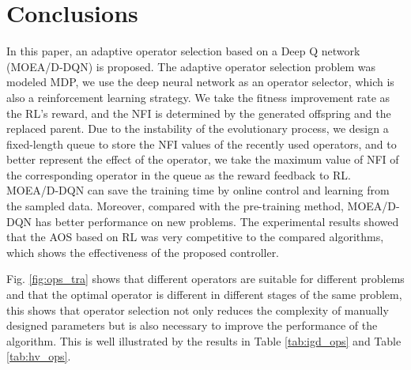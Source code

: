 \documentclass[journal]{IEEEtran}
\begin{document}
\section{Conclusions}
In this paper, an adaptive operator selection based on a Deep Q network (MOEA/D-DQN) is proposed.
The adaptive operator selection problem was modeled MDP, we use the deep neural network as an operator selector, which is also a reinforcement learning strategy.
We take the fitness improvement rate as the RL's reward, and the NFI is determined by the generated offspring and the replaced parent.
Due to the instability of the evolutionary process, we design a fixed-length queue to store the NFI values of the recently used operators, and to better represent the effect of the operator, we take the maximum value of NFI of the corresponding operator in the queue as the reward feedback to RL.
MOEA/D-DQN can save the training time by online control and learning from the sampled data. Moreover, compared with the pre-training method, MOEA/D-DQN has better performance on new problems.
The experimental results showed that the AOS based on RL was very competitive to the compared algorithms, which shows the effectiveness of the proposed controller.

Fig. \ref{fig:ops_tra} shows that different operators are suitable for different problems and that the optimal operator is different in different stages of the same problem, this shows that operator selection not only reduces the complexity of manually designed parameters but is also necessary to improve the performance of the algorithm.
This is well illustrated by the results in Table \ref{tab:igd_ops} and Table \ref{tab:hv_ops}.
\end{document}
